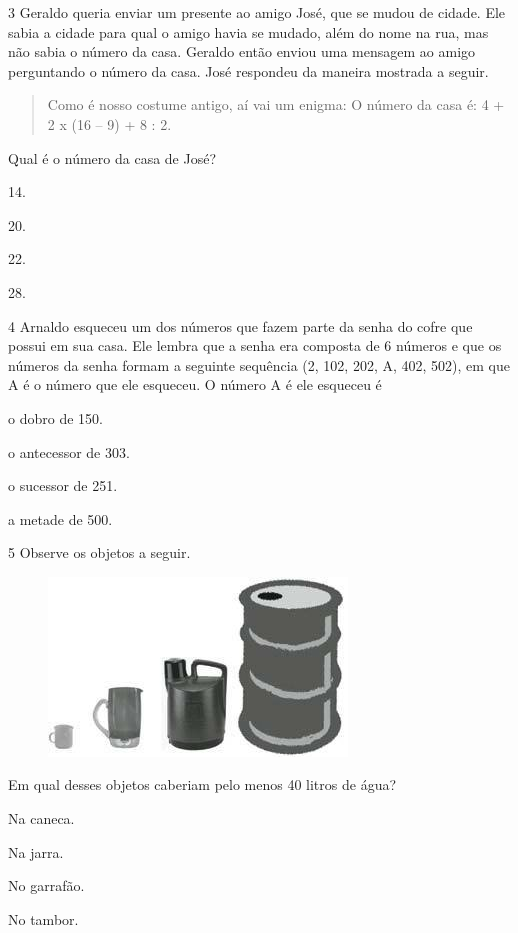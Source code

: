 \num{3} Geraldo queria enviar um presente ao amigo José, que se mudou de cidade. Ele
sabia a cidade para qual o amigo havia se mudado, além do nome na rua, mas
não sabia o número da casa. Geraldo então enviou uma mensagem ao
amigo perguntando o número da casa. José respondeu da maneira mostrada a seguir.

\begin{quote}
Como é nosso costume antigo, aí vai um enigma:
O número da casa é: 4 + 2 x (16 -- 9) + 8 : 2.
\end{quote}

Qual é o número da casa de José?

\begin{multicols}{2}
\begin{escolha}
\item
  14.
\item
  20.
\item
  22.
\item
  28.
\end{escolha}
\end{multicols}

\num{4} Arnaldo esqueceu um dos números que fazem parte da senha do cofre que
possui em sua casa. Ele lembra que a senha era composta de 6 números e
que os números da senha formam a seguinte sequência (2, 102, 202,
A, 402, 502), em que A é o número que ele esqueceu. O número A é
ele esqueceu é

\begin{escolha}
\item
  o dobro de 150.
\item
  o antecessor de 303.
\item
  o sucessor de 251.
\item
  a metade de 500.
\end{escolha}


\num{5} Observe os objetos a seguir.

\begin{figure}[htpb!]
\centering
\includegraphics[width=.3\textwidth]{media/image87.jpg}
\end{figure}

Em qual desses objetos caberiam pelo menos 40 litros de água?

\begin{multicols}{2}
\begin{escolha}
\item
  Na caneca.
\item
  Na jarra.
\item
  No garrafão.
\item
  No tambor.
\end{escolha}
\end{multicols}


